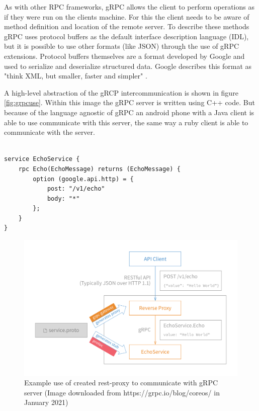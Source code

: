 \documentclass[conference]{IEEEtran}
\begin{document}
As with other RPC frameworks, gRPC allows the client to perform operations as if they were run on the clients machine. For this the client needs to be aware of method definition and location of the remote server. To describe these methods gRPC uses protocol buffers \cite{protoBuffer} as the default interface description language (IDL), but it is possible to use other formats (like JSON) through the use of gRPC extensions. Protocol buffers themselves are a format developed by Google and used to serialize and deserialize structured data. Google describes this format as "think XML, but smaller, faster and simpler" \cite{protoBuffer}. 

A high-level abstraction of the gRCP intercommunication is shown in figure \ref{fig:grpcuse}. Within this image the gRPC server is written using C++ code. But because of the language agnostic of gRPC an android phone with a Java client is able to use communicate with this server, the same way a ruby client is able to communicate with the server.

\begin{lstlisting}[name={Small sample proto buffer specification (Full example available at https://grpc.io/blog/coreos/)},label={code:grpcproto}]  % Start your code-block

service EchoService {
	rpc Echo(EchoMessage) returns (EchoMessage) {
		option (google.api.http) = {
			post: "/v1/echo"
			body: "*"
		};
	}
}
\end{lstlisting}

\begin{figure}
	\centering
	\includegraphics[width=0.8\linewidth]{grpc-rest-gateway.png}
	\caption{Example use of created rest-proxy to communicate with gRPC server (Image downloaded from https://grpc.io/blog/coreos/ in January 2021)}
	\label{fig:restProxy}
\end{figure}
\end{document}
